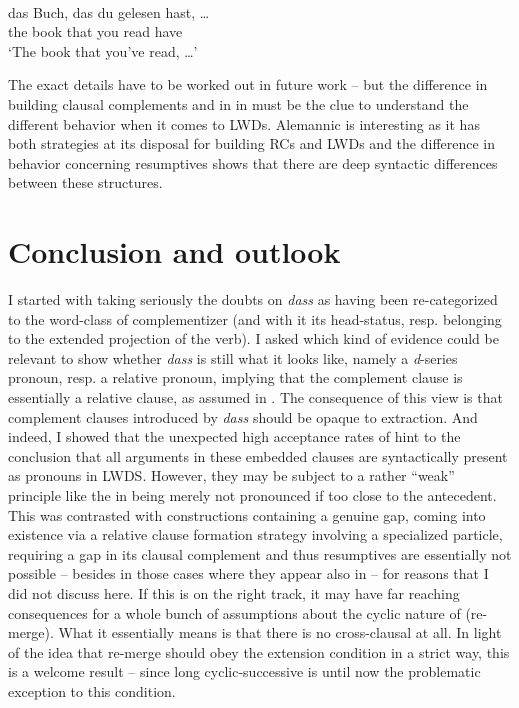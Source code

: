 \documentclass[output=paper]{langsci/langscibook}
\begin{document}
\ea\label{ex:36.19} \\
    \gll    das Buch, das   du  \underline{\hphantom{2em}}  gelesen hast, \dots{}\\
    the book that you  {}   read       have\\
    \glt    ‘The book that you’ve read, \dots{}’
\z

The exact details have to be worked out in future work -- but the difference in
building clausal complements and  in  in  must be
the clue to understand the different behavior when it comes to \glspl{LWD}.
Alemannic is interesting as it has both strategies at its disposal for building
\glspl{RC} and \glspl{LWD} and the difference in behavior concerning
resumptives shows that there are deep syntactic differences between these
structures.

\section{Conclusion and outlook} %

I started with taking seriously the doubts on \emph{dass} as having been
re-categorized to the word-class of
complementizer (and with it its head-status, resp.
belonging to the extended projection of the verb). I asked which kind of
evidence could be relevant to show whether \emph{dass} is still what it looks
like, namely a \emph{d}-series pronoun, resp. a relative pronoun, implying that
the complement clause is essentially a relative clause, as
assumed in \citet{Kayne2014}. The consequence of this view is that complement
clauses introduced by \emph{dass} should be opaque to extraction. And indeed, I
showed that the unexpected high acceptance rates of 
hint to the conclusion that all arguments in these embedded clauses are
syntactically present as pronouns in LWDS. However, they may be subject to a
rather \enquote{weak} principle like the  in being merely not
pronounced if too close to the antecedent. This was contrasted with
constructions containing a genuine gap, coming into existence via a relative
clause formation strategy involving a specialized
particle, requiring a gap in its clausal complement and thus
resumptives are
essentially not possible -- besides in those cases where they appear also in
 -- for reasons that I did not discuss here.  If this is
on the right track, it may have far reaching consequences for a whole bunch of
assumptions about the cyclic nature of  (re-merge). What it essentially
means is that there is no cross-clausal  at all. In light of the idea
that re-merge should obey the extension condition in a strict way, this is a
welcome result -- since long cyclic-successive  is until now the
problematic exception to this condition.
\end{document}
